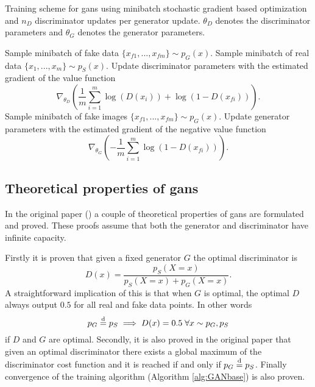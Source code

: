 \begin{algorithm}
    \caption{Training scheme for \acrlong{gans} using minibatch stochastic gradient based optimization and $n_D$ discriminator updates per generator update. $\theta_D$ denotes the discriminator parameters and $\theta_G$ denotes the generator parameters.}
    \label{alg:GANbase}
    \begin{algorithmic}[1]
        \STATE Sample minibatch of fake data $\{x_{f1}, ..., x_{fm}\} \sim p_G(x)$.
        \STATE Sample minibatch of real data $\{x_{1}, ..., x_{m}\} \sim p_S(x)$.
        \STATE Update discriminator parameters with the estimated gradient of the value function
        \begin{equation}
            \nonumber
            \nabla_{\theta_D} \left( \frac{1}{m}\sum_{i=1}^m\log(D(x_i)) + \log(1-D(x_{fi})) \right).
        \end{equation}
        \ENDFOR
        \STATE Sample minibatch of fake images $\{x_{f1}, ..., x_{fm}\} \sim p_G(x)$.
        \STATE Update generator parameters with the estimated gradient of the negative value function
        \begin{equation}
            \nonumber
            \nabla_{\theta_G} \left( - \frac{1}{m}\sum_{i=1}^m\log(1-D(x_{fi})) \right).
        \end{equation}
        \ENDFOR
    \end{algorithmic}
\end{algorithm}


\subsection{Theoretical properties of \acrshort{gans}}
In the original paper (\textcite{goodfellow2014generative}) a couple of theoretical properties of \acrshort{gans} are formulated and proved. These proofs assume that both the generator and discriminator have infinite capacity.

Firstly it is proven that given a fixed generator $G$ the optimal discriminator is 
\begin{equation}
    D(x) = \frac{p_S(X=x)}{p_S(X=x) + p_G(X=x)}.
\end{equation}
A straightforward implication of this is that when $G$ is optimal, the optimal $D$ always output $0.5$ for all real and fake data points. In other words
\begin{equation}
    p_G \stackrel{\text{d}}{=} p_S \implies D(x) = 0.5 \; \forall x \sim p_G, p_S
\end{equation}
if $D$ and $G$ are optimal. Secondly, it is also proved in the original paper that given an optimal discriminator there exists a global maximum of the discriminator cost function and it is reached if and only if $p_G \stackrel{\text{d}}{=} p_S$. Finally convergence of the training algorithm (Algorithm \ref{alg:GANbase}) is also proven.

